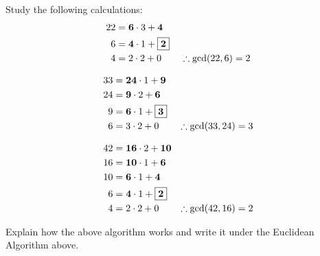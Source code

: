 \documentclass{ximera}
\begin{document}
\begin{exercise} Study the following calculations:
\begin{align*}
22 &= \boldsymbol{6}\cdot 3 + \boldsymbol{4}\\ 6 &= \boldsymbol{4}
\cdot 1 + \fbox{$\boldsymbol{2}$}\\ 4 &= 2 \cdot 2 + 0 \qquad
\therefore \gcd(22,6) = 2
\end{align*}

\begin{align*}
33 &= \boldsymbol{24}\cdot 1 + \boldsymbol{9}\\
24 &= \boldsymbol{9} \cdot 2 + \boldsymbol{6}\\
9 &= \boldsymbol{6} \cdot 1 + \fbox{$\boldsymbol{3}$}\\
6 &= 3 \cdot 2 + 0 \qquad \therefore \gcd(33,24) = 3 
\end{align*}

\begin{align*}
42 &= \boldsymbol{16}\cdot 2 + \boldsymbol{10}\\
16 &= \boldsymbol{10} \cdot 1 + \boldsymbol{6}\\
10 &= \boldsymbol{6} \cdot 1 + \boldsymbol{4}\\
6 &= \boldsymbol{4} \cdot 1 + \fbox{$\boldsymbol{2}$}\\
4 &= 2 \cdot 2 + 0 \qquad \therefore \gcd(42,16) = 2 
\end{align*}

Explain how the above algorithm works and write it under the Euclidean
Algorithm above.
\end{exercise}
\end{document}

